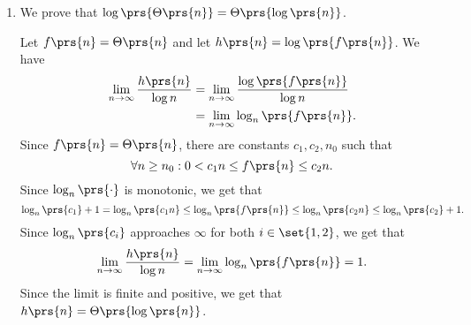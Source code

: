 \documentclass[oneside]{scrbook}
\theoremstyle{definition}
\begin{document}
\begin{exercise}
\begin{enumerate}[label = \alph*.]
        \begin{proof}[Proof (Equation (3.28))]
            We have
            \begin{align*}
                \log\prs{n!} &= \sum_{k \in \brs{n}} \log\prs{k} \leq \sum_{k \in \brs{n}} \log\prs{n} = n \log \prs{n} \text{,} 
            \end{align*}
            hence $\log\prs{n!} = \mrm{O}\prs{n \log n}$.

            On the other hand,
            \begin{align*}
                \log\prs{n!} &= \sum_{k \in \brs{n}} \log\prs{k}
                \\&\geq
                \sum_{k = \floor{\frac{n}{2}}}^n \log\prs{k}
                \\&\geq
                \sum_{k = \floor{\frac{n}{2}}}^n \log\prs{\floor{\frac{n}{2}}}
                \\&=
                \ceil{\frac{n}{2}} \log\prs{\floor{\frac{n}{2}}}
                \\&\geq
                \floor{\frac{n}{2}} \log\prs{\floor{\frac{n}{2}}}
            \end{align*}
            and since $n \log n$ is monotonic, this is at least $\frac{n}{4} \log\prs{\frac{n}{4}}$ for $n \geq 4$. We get Hence
            Then
            \begin{align*}
                \log\prs{n!} &= \Omega\prs{\frac{n}{4} \log\prs{\frac{n}{4}}}
                \\&= \Omega\prs{n \prs{\log\prs{n} - \log\prs{4}}}
                \\&= \Omega\prs{n \log n} \text{.}
            \end{align*}
        \end{proof}

        \item We prove that $\log\prs{\Theta\prs{n}} = \Theta\prs{\log\prs{n}}$.

        Let $f\prs{n} = \Theta\prs{n}$ and let $h\prs{n} = \log\prs{f\prs{n}}$. We have
        \begin{align*}
            \lim_{n\to\infty} \frac{h\prs{n}}{\log n} &=
            \lim_{n\to\infty} \frac{\log\prs{f\prs{n}}}{\log n} \\&=
            \lim_{n\to\infty} \log_n\prs{f\prs{n}} \text{.}
        \end{align*}
        Since $f\prs{n} = \Theta\prs{n}$, there are constants $c_1, c_2, n_0$ such that
        \[\forall n\geq n_0: 0 < c_1 n \leq f\prs{n} \leq c_2 n \text{.}\]
        Since $\log_n\prs{\cdot}$ is monotonic, we get that
        \[\log_n\prs{c_1} + 1 = \log_n\prs{c_1 n} \leq \log_n\prs{f\prs{n}} \leq \log_n\prs{c_2 n} \leq \log_n\prs{c_2} + 1 \text{.}\]
        Since $\log_n\prs{c_i}$ approaches $\infty$ for both $i \in \set{1,2}$, we get that \[\lim_{n \to \infty} \frac{h\prs{n}}{\log n} = \lim_{n\to\infty} \log_n\prs{f\prs{n}} = 1 \text{.}\]
        Since the limit is finite and positive, we get that $h\prs{n} = \Theta\prs{\log\prs{n}}$.
    \end{enumerate}

\end{exercise}
\end{document}
